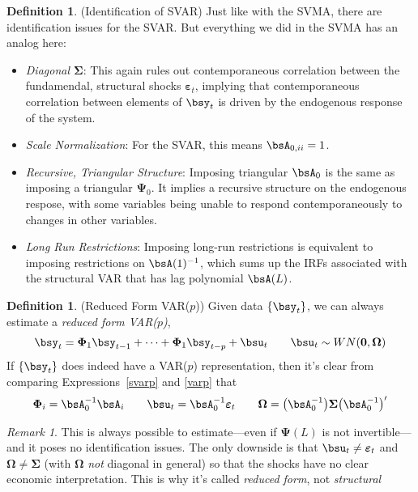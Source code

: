 \documentclass[12pt]{article}
\theoremstyle{plain}
\theoremstyle{definition}
\newtheorem{defn}[thm]{Definition}
\theoremstyle{remark}
\newtheorem*{rmk}{Remark}
\newcommand{\bsSigma}{\boldsymbol{\Sigma}}
\newcommand{\bsvarepsilon}{\boldsymbol{\varepsilon}}
\newcommand{\bsOmega}{\boldsymbol{\Omega}}
\newcommand{\bsPsi}{\boldsymbol{\Psi}}
\newcommand{\bsPhi}{\boldsymbol{\Phi}}
\renewcommand{\bso}{\boldsymbol{0}}
\begin{document}
\begin{defn}(Identification of SVAR)
Just like with the SVMA, there are identification issues for the SVAR.
But everything we did in the SVMA has an analog here:
\begin{itemize}
  \item \emph{Diagonal $\bsSigma$}: This again rules out contemporaneous
    correlation between the fundamendal, structural shocks
    $\bsvarepsilon_t$, implying that contemporaneous correlation between
    elements of $\bsy_t$ is driven by the endogenous response of the
    system.
  \item \emph{Scale Normalization}: For the SVAR, this means
    $\bsA_{0,ii}=1$.
  \item \emph{Recursive, Triangular Structure}: Imposing triangular
    $\bsA_0$ is the same as imposing a triangular $\bsPsi_0$. It implies
    a recursive structure on the endogenous respose, with some variables
    being unable to respond contemporaneously to changes in other
    variables.
  \item \emph{Long Run Restrictions}: Imposing long-run restrictions is
    equivalent to imposing restrictions on $\bsA(1)^{-1}$, which sums up
    the IRFs associated with the structural VAR that has lag polynomial
    $\bsA(L)$.
\end{itemize}
\end{defn}

\begin{defn}(Reduced Form VAR($p$))
Given data $\{\bsy_t\}$, we can always estimate a
\emph{reduced form VAR($p$)},
\begin{align}
  \bsy_t =
  \bsPhi_1\bsy_{t-1}
  + \cdots + \bsPhi_1\bsy_{t-p} + \bsu_t
  \qquad
  \bsu_t \sim WN(\bso,\bsOmega)
  \label{varp}
\end{align}
If $\{\bsy_t\}$ does indeed have a VAR($p$) representation, then it's
clear from comparing Expressions~\ref{svarp} and \ref{varp} that
\begin{align*}
  \bsPhi_i = \bsA_0^{-1}\bsA_i
  \qquad
  \bsu_t = \bsA_0^{-1}\bsvarepsilon_t
  \qquad
  \bsOmega = \big(\bsA_0^{-1}\big)\bsSigma\big(\bsA_0^{-1}\big)'
\end{align*}
\end{defn}
\begin{rmk}
This is always possible to estimate---even if $\bsPsi(L)$ is not
invertible---and it poses no identification issues. The only downside is
that $\bsu_t\neq \bsvarepsilon_t$ and $\bsOmega\neq\bsSigma$ (with
$\bsOmega$ \emph{not} diagonal in general) so that the shocks have no
clear economic interpretation. This is why it's called
\emph{reduced form}, not \emph{structural}
\end{rmk}
\end{document}
